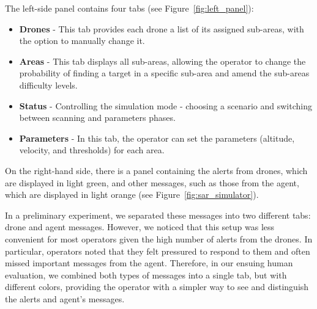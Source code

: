 The left-side panel contains four tabs (see Figure~\ref{fig:left_panel}):
\begin{itemize}
    \item \textbf{Drones} - This tab provides each drone a list of its assigned sub-areas, with the option to manually change it.
    \item \textbf{Areas} - This tab displays all sub-areas, allowing the operator to change the probability of finding a target in a specific sub-area and amend the sub-areas difficulty levels.
    \item \textbf{Status} - Controlling the simulation mode - choosing a scenario and switching between scanning and parameters phases. 
    \item \textbf{Parameters} - In this tab, the operator can set the parameters (altitude, velocity, and thresholds) for each area.
\end{itemize}


On the right-hand side, there is a panel containing the alerts from drones, which are displayed in light green, and other messages, such as those from the agent, which are displayed in light orange (see Figure~\ref{fig:sar_simulator}). 

In a preliminary experiment, we separated these messages into two different tabs: drone and agent messages. However, we noticed that this setup was less convenient for most operators given the high number of alerts from the drones. In particular, operators noted that they felt pressured to respond to them and often missed important messages from the agent. Therefore, in our ensuing human evaluation, we combined both types of messages into a single tab, but with different colors, providing the operator with a simpler way to see and distinguish the alerts and agent's messages. 


